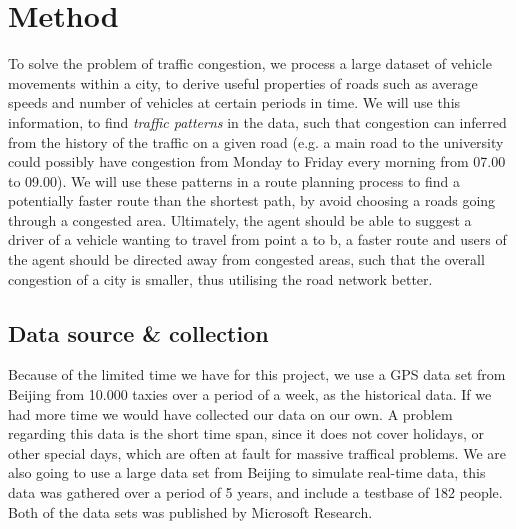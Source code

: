 \section{Method}
To solve the problem of traffic congestion, we process a large dataset of vehicle movements within a city, to derive useful properties of roads such as average speeds and number of vehicles at certain periods in time. We will use this information, to find \emph{traffic patterns} in the data, such that congestion can inferred from the history of the traffic on a given road (e.g. a main road to the university could possibly have congestion from Monday to Friday every morning from 07.00 to 09.00). We will use these patterns in a route planning process to find a potentially faster route than the shortest path, by avoid choosing a roads going through a congested area. Ultimately, the agent should be able to suggest a driver of a vehicle wanting to travel from point a to b, a faster route and users of the agent should be directed away from congested areas, such that the overall congestion of a city is smaller, thus utilising the road network better.

\subsection*{Data source \& collection}
Because of the limited time we have for this project, we use a GPS data set from Beijing from 10.000 taxies over a period of a week, as the historical data\cite{Tdrive}. If we had more time we would have collected our data on our own. A problem regarding this data is the short time span, since it does not cover holidays, or other special days, which are often at fault for massive traffical problems. We are also going to use a large data set from Beijing to simulate real-time data, this data was gathered over a period of 5 years, and include a testbase of 182 people\cite{Geolife}. Both of the data sets was published by Microsoft Research.

